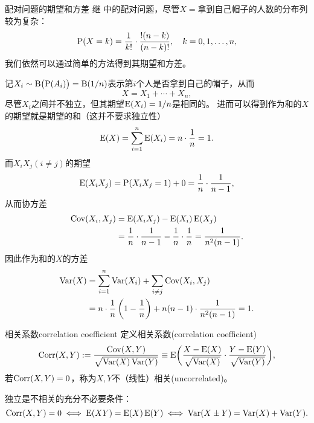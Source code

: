 \begin{example}{配对问题的期望和方差}{}
	继 中的配对问题，尽管$X=$拿到自己帽子的人数的分布列较为复杂：
	\begin{equation}
		\P(X=k)=\frac1{k!}\cdot\frac{!(n-k)}{(n-k)!},\quad k=0,1,\ldots,n,
	\end{equation}
	我们依然可以通过简单的方法得到其期望和方差。
	
	记$X_i\sim\Bino\bigkh{\P(A_i)}=\Bino(1/n)$表示第$i$个人是否拿到自己的帽子，从而
	\[
		X=X_1+\cdots+X_n,
	\]
	尽管$X_i$之间并不独立，但其期望$\E(X_i)=1/n$是相同的。
	进而可以得到作为和的$X$的期望就是期望的和（这并不要求独立性）
	\begin{equation}
		\E(X)=\sum_{i=1}^n\E(X_i)=n\cdot\frac1n=1.
	\end{equation}
	而$X_iX_j(i\neq j)$的期望
	\[
		\E(X_iX_j)=\P(X_iX_j=1)+0=\frac1n\cdot\frac1{n-1},
	\]
	从而协方差
	\begin{equation}
		\begin{aligned}
			\Cov(X_i,X_j)&=\E(X_iX_j)-\E(X_i)\E(X_j)\\
			&=\frac1n\cdot\frac1{n-1}-\frac1n\cdot\frac1n=\frac1{n^2(n-1)}.
		\end{aligned}
	\end{equation}
	因此作为和的$X$的方差
	\begin{equation}
		\begin{aligned}
			\Var(X)&=\sum_{i=1}^n\Var(X_i)+\sum_{i\neq j}\Cov(X_i,X_j)\\
			&=n\cdot\frac1n\kh{1-\frac1n}+n(n-1)\cdot\frac1{n^2(n-1)}=1.
		\end{aligned}
	\end{equation}
\end{example}
\begin{definition}{相关系数}{correlation coefficient}
	定义相关系数(correlation coefficient)
	\begin{equation}
		\Corr(X,Y):=\frac{\Cov(X,Y)}{\sqrt{\Var(X)\Var(Y)}}\equiv\E\biggkh{\frac{X-\E(X)}{\sqrt{\Var(X)}}\cdot\frac{Y-\E(Y)}{\sqrt{\Var(Y)}}},
	\end{equation}
	若$\Corr(X,Y)=0$，称为$X,Y$不（线性）相关(uncorrelated)。
\end{definition}

\begin{corollary}
	独立是不相关的充分不必要条件：
	\begin{equation}
		\Corr(X,Y)=0
		\iff\E(XY)=\E(X)\E(Y)
		\iff\Var(X\pm Y)=\Var(X)+\Var(Y).
	\end{equation}
\end{corollary}

